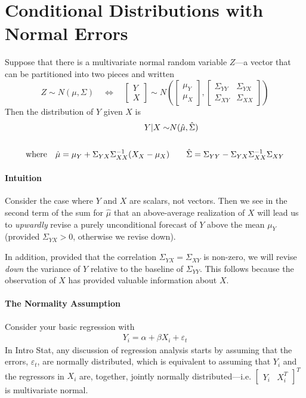 \documentclass[a4paper,12pt]{article}
\begin{document}
\section{Conditional Distributions with Normal Errors}
\label{sec:mvncond}

Suppose that there is a multivariate normal random variable $Z$---a
vector that can be partitioned into two pieces and written
\[
  Z \sim N(\mu, \Sigma) \quad\Leftrightarrow\quad
  \begin{bmatrix} Y \\ X \end{bmatrix}
  \sim 
  N\left(\begin{bmatrix} \mu_Y \\ \mu_X \end{bmatrix},
  \begin{bmatrix} \Sigma_{YY} & \Sigma_{YX} \\
  \Sigma_{XY} & \Sigma_{XX} \end{bmatrix} 
  \right)
\]
Then the distribution of $Y$ given $X$ is 
\begin{align}
  Y | X \sim &N(\hat{\mu}, \hat{\Sigma})  \notag\\
  \label{reg} \\
  \text{where} \quad
  \hat{\mu} = \mu_Y + \Sigma_{YX} \Sigma^{-1}_{XX} 
  (X_X-\mu_X)  & \quad \quad
  \hat{\Sigma} = \Sigma_{YY} - \Sigma_{YX} \Sigma^{-1}_{XX} 
    \Sigma_{XY}
  \notag
\end{align}

\paragraph{Intuition}
Consider the case where $Y$ and $X$ are scalars, not vectors. Then we
see in the second term of the sum for $\hat{\mu}$ that an above-average
realization of $X$ will lead us to \emph{upwardly} revise a purely
unconditional forecast of $Y$ above the mean $\mu_Y$ (provided
$\Sigma_{YX}>0$, otherwise we revise down).  

In addition, provided that the correlation $\Sigma_{YX} = \Sigma_{XY}$
is non-zero, we will revise \emph{down} the variance of $Y$ relative to
the baseline of $\Sigma_{YY}$. This follows because the observation of
$X$ has provided valuable information about $X$. 


\paragraph{The Normality Assumption} 
Consider your basic regression with 
\begin{align}
  \label{regex}
  Y_i = \alpha + \beta X_i + \varepsilon_t
\end{align}
In Intro Stat, any discussion of regression analysis starts by assuming
that the errors, $\varepsilon_t$, are normally distributed, which is
equivalent to assuming that $Y_i$ and the regressors in $X_i$ are,
together, jointly normally distributed---i.e.  $\begin{bmatrix} Y_i &
  X^T_i \end{bmatrix}^T$ is  multivariate normal. 
\end{document}
